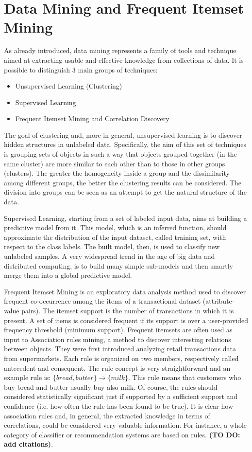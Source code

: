 \section{Data Mining and Frequent Itemset Mining}
As already introduced, data mining represents a family of tools and technique aimed at extracting usable and effective knowledge from collections of data. It is possible to distinguish 3 main groups of techniques:
\begin{itemize}
\item Unsupervised Learning (Clustering)~\cite{Xu_2005SurveyClustering}
\item Supervised Learning~\cite{AggarwalBookClassification}
\item Frequent Itemset Mining and Correlation Discovery~\cite{Han_2007SurveyFIM}
\end{itemize}

The goal of clustering and, more in general, unsupervised learning is to discover hidden structures in unlabeled data. Specifically, the aim of this set of techniques is grouping sets of objects in such a way that objects grouped together (in the same cluster) are more similar to each other than to those in other groups (clusters). The greater the homogeneity inside a group and the dissimilarity among different groups, the better the clustering results can be considered. The division into groups can be seen as an attempt to get the natural structure of the data.

Supervised Learning, starting from a set of labeled input data, aims at building a predictive model from it. This model, which is an inferred function, should approximate the distribution of the input dataset, called training set, with respect to the class labels. The built model, then, is used to classify new unlabeled samples. A very widespread trend in the age of big data and distributed computing, is to build many simple sub-models and then smartly merge them into a global predictive model.

Frequent Itemset Mining is an exploratory data analysis method used to discover frequent co-occurrence among the items of a transactional dataset (attribute-value pairs). The itemset support is the number of transactions in which it is present. A set of items is considered frequent if its support is over a user-provided frequency threshold (minimum support).
Frequent itemsets are often used as input to Association rules mining, a method to discover interesting relations between objects. They were first introduced analyzing retail transactions data from supermarkets. Each rule is organized on two members, respectively called antecedent and consequent. The rule concept is very straightforward and an example rule is: $\{bread, butter\} \rightarrow \{milk\}$. This rule means that customers who buy bread and butter usually buy also milk. Of course, the rules should considered statistically significant just if supported by a sufficient support and confidence (i.e. how often the rule has been found to be true).
It is clear how association rules and, in general, the extracted knowledge in terms of correlations, could be considered very valuable information. For instance, a whole category of classifier or recommendation systems are based on rules. \textbf{(TO DO: add citations)}.

